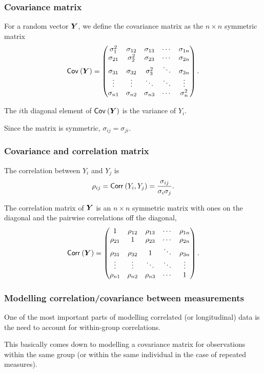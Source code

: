 \documentclass{beamer}
\begin{document}
\begin{frame}
\frametitle{Covariance matrix}
\bi
\item For a random vector $\boldsymbol {Y}$, 
we define the \alert{covariance matrix} as the  $n\times n$ symmetric matrix
\[
{\mathsf{Cov}_{}}\left(\boldsymbol {Y}\right)=
  \begin{pmatrix}
    \sigma_1^2 & \sigma_{12} & \sigma_{13} & \cdots & \sigma_{1n} \\
     \sigma_{21} & \sigma_{2}^2 & \sigma_{23} & \cdots & \sigma_{2n} \\
      \sigma_{31} & \sigma_{32} & \sigma_{3}^2 & \ddots & \sigma_{3n} \\
    \vdots &  \vdots &  \ddots & \ddots &  \vdots \\
        \sigma_{n1} & \sigma_{n2} & \sigma_{n3} & \cdots & \sigma_{n}^2 \\
  \end{pmatrix}.
\]
\item The $i$th diagonal element of ${\mathsf{Cov}_{}}\left(\boldsymbol {Y}\right)$ is the variance of $Y_i$.
\item Since the matrix is symmetric, $\sigma_{ij}=\sigma_{ji}$.
\ei
\end{frame}

\begin{frame}
\frametitle{Covariance and correlation matrix}
\bi
\item The correlation between $Y_i$ and $Y_j$ is 
\begin{align*}
\rho_{ij}={\mathsf{Corr}_{}}\left(Y_i, Y_j\right)=\frac{\sigma_{ij}}{\sigma_i\sigma_j}.
\end{align*}
\item The \alert{correlation matrix} of $\boldsymbol {Y}$ is an
$n\times n$ symmetric matrix with ones on the diagonal and the pairwise correlations off the diagonal, 
\[
{\mathsf{Corr}_{}}\left(\boldsymbol {Y}\right)=
  \begin{pmatrix}
    1 & \rho_{12} & \rho_{13} & \cdots & \rho_{1n} \\
     \rho_{21} & 1 & \rho_{23}& \cdots & \rho_{2n} \\
     \rho_{31} & \rho_{32} & 1& \ddots & \rho_{3n} \\
    \vdots &  \vdots &  \ddots & \ddots &  \vdots \\
        \rho_{n1} & \rho_{n2} & \rho_{n3} & \cdots & 1 \\
  \end{pmatrix}.
\]
\ei
\end{frame}
\begin{frame}
\frametitle{Modelling correlation/covariance between measurements}
 One of the most important parts of modelling 
correlated (or longitudinal) data is the need to account for within-group correlations. 
\bi \item This basically comes down to modelling a covariance matrix for observations within the same group (or within the same individual in the case of repeated measures).
\ei
\end{frame}
\end{document}
